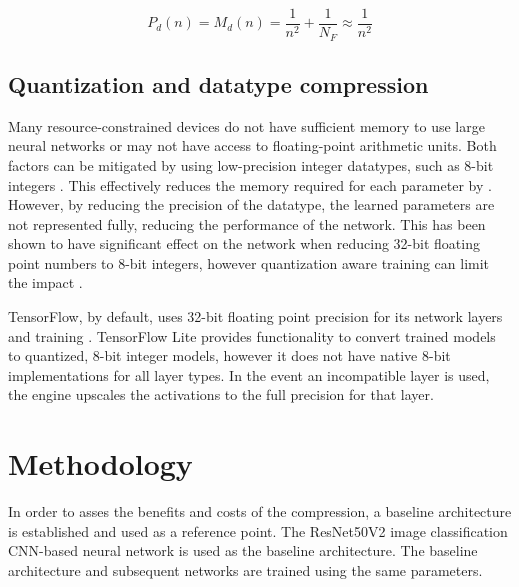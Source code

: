 \documentclass{article}
\begin{document}
	\begin{equation} \label{eqn:depthwise}
		P_d(n) = M_d(n) = \frac{1}{n^2} + \frac{1}{N_F} \approx \frac{1}{n^2}
	\end{equation}
	
	
	\subsection{Quantization and datatype compression}
	
	Many resource-constrained devices do not have sufficient memory to use large neural networks or may not have access to floating-point arithmetic units. Both factors can be mitigated by using low-precision integer datatypes, such as 8-bit integers \cite{scalable8bit,quantfriendlymobilenet}. This effectively reduces the memory required for each parameter by . However, by reducing the precision of the datatype, the learned parameters are not represented fully, reducing the performance of the network. This has been shown to have significant effect on the network when reducing 32-bit floating point numbers to 8-bit integers, however quantization aware training can limit the impact \cite{scalable8bit}. 
	
	TensorFlow, by default, uses 32-bit floating point precision for its network layers and training \cite{tensorflow2015-whitepaper}. TensorFlow Lite provides functionality to convert trained models to quantized, 8-bit integer models, however it does not have native 8-bit implementations for all layer types. In the event an incompatible layer is used, the engine upscales the activations to the full precision for that layer.
	
	\section{Methodology}
	\label{sec:methodology}
	In order to asses the benefits and costs of the compression, a baseline architecture is established and used as a reference point. The ResNet50V2 image classification CNN-based neural network is used as the baseline architecture. The baseline architecture and subsequent networks are trained using the same parameters. 
	
\end{document}

